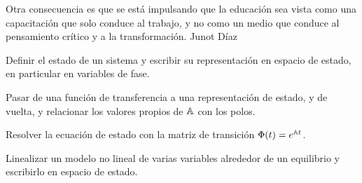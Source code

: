 
  {Otra consecuencia es que se está impulsando que la educación sea vista como una capacitación que solo conduce al trabajo, y no como un medio que conduce al pensamiento crítico y a la transformación.}
  {Junot Díaz}

\begin{objetivos}
  \item Definir el estado de un sistema y escribir su representación en espacio de estado, en particular en variables de fase.
  \item Pasar de una función de transferencia a una representación de estado, y de vuelta, y relacionar los valores propios de $\mathbb{A}$ con los polos.
  \item Resolver la ecuación de estado con la matriz de transición $\Phi(t)=e^{\mathbb{A} t}$.
  \item Linealizar un modelo no lineal de varias variables alrededor de un equilibrio y escribirlo en espacio de estado.
\end{objetivos}









